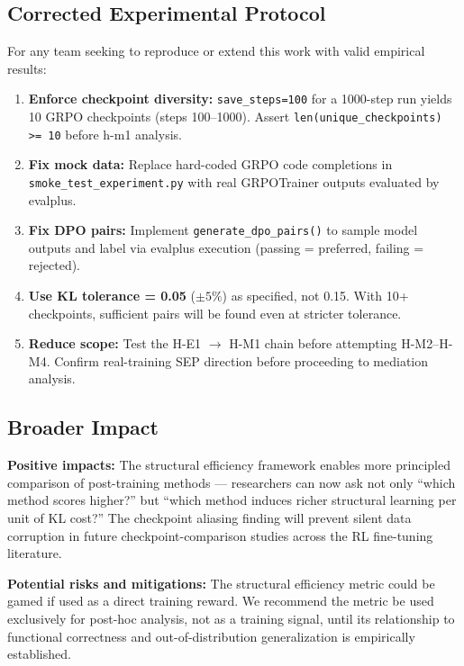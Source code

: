\subsection{Corrected Experimental Protocol}
\label{sec:corrected_protocol}

For any team seeking to reproduce or extend this work with valid empirical results:

\begin{enumerate}
  \item \textbf{Enforce checkpoint diversity:} \texttt{save\_steps=100} for a 1000-step run yields
    10 GRPO checkpoints (steps 100--1000). Assert \texttt{len(unique\_checkpoints) >= 10}
    before h-m1 analysis.
  \item \textbf{Fix mock data:} Replace hard-coded GRPO code completions in \texttt{smoke\_test\_experiment.py}
    with real GRPOTrainer outputs evaluated by evalplus.
  \item \textbf{Fix DPO pairs:} Implement \texttt{generate\_dpo\_pairs()} to sample model outputs
    and label via evalplus execution (passing = preferred, failing = rejected).
  \item \textbf{Use KL tolerance = 0.05} ($\pm 5\%$) as specified, not 0.15. With 10+ checkpoints,
    sufficient pairs will be found even at stricter tolerance.
  \item \textbf{Reduce scope:} Test the H-E1 $\rightarrow$ H-M1 chain before attempting H-M2--H-M4.
    Confirm real-training SEP direction before proceeding to mediation analysis.
\end{enumerate}

\subsection{Broader Impact}

\textbf{Positive impacts:} The structural efficiency framework enables more principled
comparison of post-training methods --- researchers can now ask not only ``which
method scores higher?'' but ``which method induces richer structural learning per
unit of KL cost?'' The checkpoint aliasing finding will prevent silent data corruption
in future checkpoint-comparison studies across the RL fine-tuning literature.

\textbf{Potential risks and mitigations:} The structural efficiency metric could be
gamed if used as a direct training reward. We recommend the metric be used exclusively
for post-hoc analysis, not as a training signal, until its relationship to
functional correctness and out-of-distribution generalization is empirically
established.
